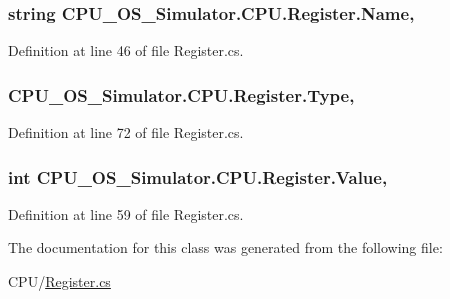 \subsubsection[{Name}]{\setlength{\rightskip}{0pt plus 5cm}string C\+P\+U\+\_\+\+O\+S\+\_\+\+Simulator.\+C\+P\+U.\+Register.\+Name\hspace{0.3cm}{\ttfamily [get]}, {\ttfamily [set]}}\label{class_c_p_u___o_s___simulator_1_1_c_p_u_1_1_register_a75621754d2c4c740c52b6c21a8151dc4}


Definition at line 46 of file Register.\+cs.

\hypertarget{class_c_p_u___o_s___simulator_1_1_c_p_u_1_1_register_ac9df7ddedb74ab974a57a334b42e0381}{}
\subsubsection[{Type}]{ C\+P\+U\+\_\+\+O\+S\+\_\+\+Simulator.\+C\+P\+U.\+Register.\+Type\hspace{0.3cm}{\ttfamily [get]}, {\ttfamily [set]}}\label{class_c_p_u___o_s___simulator_1_1_c_p_u_1_1_register_ac9df7ddedb74ab974a57a334b42e0381}


Definition at line 72 of file Register.\+cs.

\hypertarget{class_c_p_u___o_s___simulator_1_1_c_p_u_1_1_register_a1cabe4ad65d4dc6267be9f34d682e181}{}
\subsubsection[{Value}]{\setlength{\rightskip}{0pt plus 5cm}int C\+P\+U\+\_\+\+O\+S\+\_\+\+Simulator.\+C\+P\+U.\+Register.\+Value\hspace{0.3cm}{\ttfamily [get]}, {\ttfamily [set]}}\label{class_c_p_u___o_s___simulator_1_1_c_p_u_1_1_register_a1cabe4ad65d4dc6267be9f34d682e181}


Definition at line 59 of file Register.\+cs.



The documentation for this class was generated from the following file\+:\begin{DoxyCompactItemize}
\item 
C\+P\+U/\hyperlink{_register_8cs}{Register.\+cs}\end{DoxyCompactItemize}
